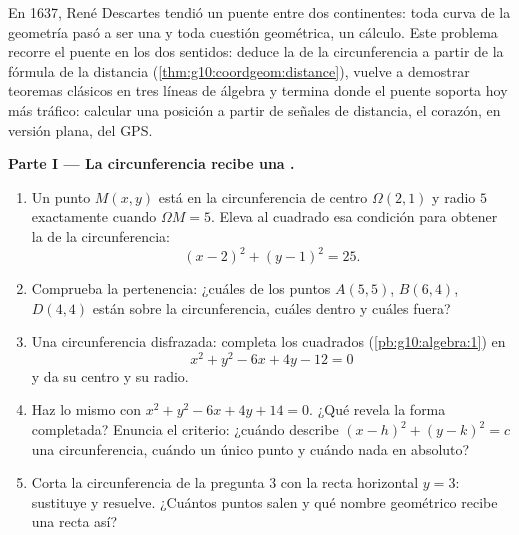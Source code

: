 \begin{problem}
\label{pb:g10:coordgeom:1}
En 1637, René Descartes tendió un puente entre dos continentes: toda curva
de la geometría pasó a ser una \emph{} y toda cuestión geométrica,
un cálculo. Este problema recorre el puente en los dos sentidos: deduce la
 de la circunferencia a partir de la fórmula de la distancia
(\cref{thm:g10:coordgeom:distance}), vuelve a demostrar teoremas clásicos
en tres líneas de álgebra y termina donde el puente soporta hoy más
tráfico: calcular una posición a partir de señales de distancia, el
corazón, en versión plana, del GPS.

\medskip
\noindent\textbf{Parte I --- La circunferencia recibe una .}
\begin{enumerate}
  \item Un punto $M(x, y)$ está en la circunferencia de centro
        $\Omega(2, 1)$ y radio $5$ exactamente cuando $\Omega M = 5$.
        Eleva al cuadrado esa condición para obtener la  de la
        circunferencia:
        \[
        (x - 2)^2 + (y - 1)^2 = 25 .
        \]
  \item Comprueba la pertenencia: ¿cuáles de los puntos $A(5, 5)$,
        $B(6, 4)$, $D(4, 4)$ están sobre la circunferencia, cuáles dentro
        y cuáles fuera?
  \item Una circunferencia disfrazada: completa los cuadrados
        (\cref{pb:g10:algebra:1}) en
        \[
        x^2 + y^2 - 6x + 4y - 12 = 0
        \]
        y da su centro y su radio.
  \item Haz lo mismo con $x^2 + y^2 - 6x + 4y + 14 = 0$. ¿Qué revela la
        forma completada? Enuncia el criterio: ¿cuándo describe
        $(x - h)^2 + (y - k)^2 = c$ una circunferencia, cuándo un único
        punto y cuándo nada en absoluto?
  \item Corta la circunferencia de la pregunta 3 con la recta horizontal
        $y = 3$: sustituye y resuelve. ¿Cuántos puntos salen y qué nombre
        geométrico recibe una recta así?
\end{enumerate}


\end{problem}
